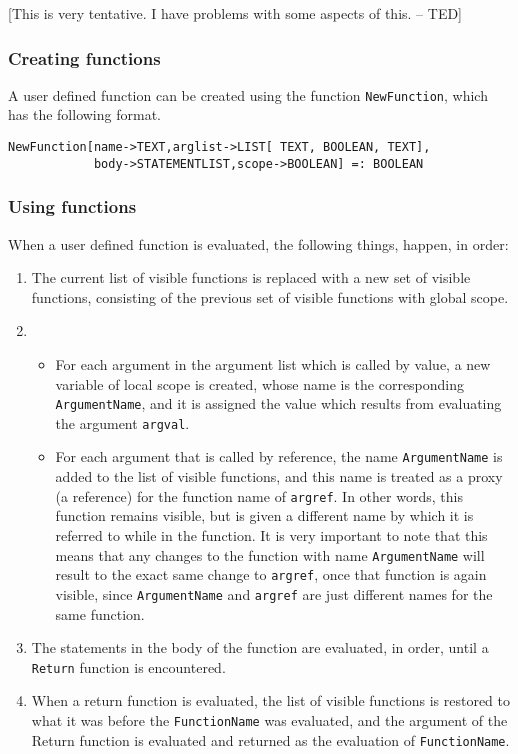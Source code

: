 [This is very tentative.  I have problems with some aspects of this. -- TED]

\subsubsection{Creating functions}
A user defined function can be created using the function
\verb+NewFunction+, which has the following format.

\begin{verbatim}
NewFunction[name->TEXT,arglist->LIST[ TEXT, BOOLEAN, TEXT], 
            body->STATEMENTLIST,scope->BOOLEAN] =: BOOLEAN
\end{verbatim}

\subsubsection{Using functions}

When a user defined function is evaluated, the following things,
happen, in order:

\begin{enumerate}
\item
The current list of visible functions is 
replaced with a new set of visible functions, consisting of the
previous set of visible functions with global scope.  
 
\item
\begin{itemize}
\item
For each argument in the argument list which is called by
value, a new variable of local scope is created, whose name is the
corresponding \verb+ArgumentName+, and it is assigned the value
which results from evaluating the argument \verb+argval+.  
\item
For each
argument that is called by reference, the name \verb+ArgumentName+ is
added to the list of visible functions, and this name is treated as a
proxy (a reference) for the function name of \verb+argref+.  In other
words, this function remains visible, but is given a different name by
which it is referred to while in the function.  It is very important
to note that this means that any changes to the function with name
\verb+ArgumentName+ will result to the exact same change to
\verb+argref+, once that function is again visible, since
\verb+ArgumentName+ and \verb+argref+ are just different names for the
same function.
\end{itemize}

\item
The statements in the body of the function are evaluated, in
order, until a \verb+Return+ function is encountered.  

\item
When a return function is evaluated, the list of visible
functions is restored to what it was before the \verb+FunctionName+
was evaluated, and the argument of the Return function is evaluated
and returned as the evaluation of \verb+FunctionName+. 
\end{enumerate}

